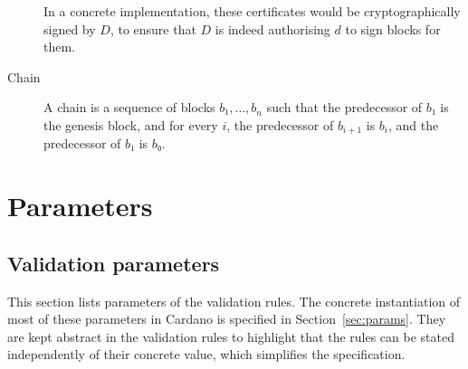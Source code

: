\documentclass{article}
\newenvironment{record}{\begin{description}[font=\it]}{\end{description}}
\begin{document}
\begin{description}
\begin{record}
  In a concrete implementation, these certificates would be
  cryptographically signed by $D$, to ensure that $D$ is indeed
  authorising $d$ to sign blocks for them.
  \end{record}

\item[Chain] A chain is a sequence of blocks $b₁,…,b_n$ such that the
  predecessor of $b₁$ is the genesis block, and for every $i$, the
  predecessor of $b_{i+1}$ is $b_i$, and the predecessor of $b₁$ is
  $b₀$.

\end{description}

\section{Parameters}
\label{sec:parameters}

\subsection{Validation parameters}
\label{sec:validation-parameters}

This section lists parameters of the validation rules. The concrete
instantiation of most of these parameters in Cardano is specified in
Section~\ref{sec:params}. They are kept abstract in the validation
rules to highlight that the rules can be stated independently of their
concrete value, which simplifies the specification.
\end{document}

